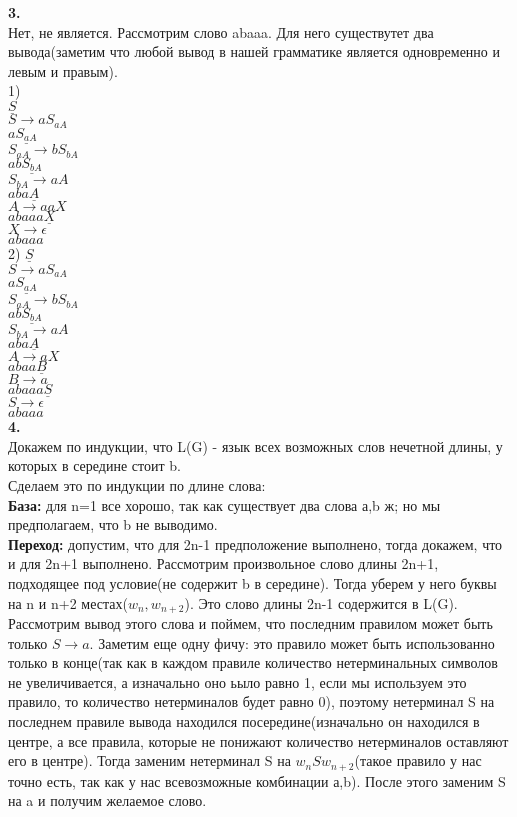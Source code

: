 \documentclass[a4paper,12pt]{article}
\begin{document}
\textbf{3.}\\
Нет, не является. Рассмотрим слово abaaa. Для него существутет два вывода(заметим что любой вывод в нашей грамматике является одновременно и левым и правым).\\
1)\\
$\underline{S}$\\
$S\rightarrow aS_{aA}$\\
$a\underline{S_{aA}}$\\
$S_{aA} \rightarrow bS_{bA}$\\
$ab\underline{S_{bA}}$\\
$S_{bA} \rightarrow aA$\\
$aba\underline{A}$\\
$A \rightarrow aaX$\\
$abaaa\underline{X}$\\
$X \rightarrow \epsilon$\\
$abaaa$\\
2)
$\underline{S}$\\
$S\rightarrow aS_{aA}$\\
$a\underline{S_{aA}}$\\
$S_{aA} \rightarrow bS_{bA}$\\
$ab\underline{S_{bA}}$\\
$S_{bA} \rightarrow aA$\\
$aba\underline{A}$\\
$A \rightarrow aX$\\
$abaa\underline{B}$\\
$B \rightarrow a$\\
$abaaa\underline{S}$\\
$S \rightarrow \epsilon$\\
$abaaa$\\
\textbf{4.}\\
Докажем по индукции, что L(G) - язык всех возможных слов нечетной длины, у которых в середине стоит b.\\
Сделаем это по индукции по длине слова:\\
\textbf{База:} для n=1 все хорошо, так как существует два слова а,b ж; но мы предполагаем, что b не выводимо.\\
\textbf{Переход:} допустим, что для 2n-1 предположение выполнено, тогда докажем, что и для 2n+1 выполнено. Рассмотрим произвольное слово длины 2n+1, подходящее под условие(не содержит b в середине). Тогда уберем у него буквы на n и n+2 местах($w_{n},w_{n+2}$). Это слово длины 2n-1 содержится в L(G). Рассмотрим вывод этого слова и поймем, что последним правилом может быть только $S\rightarrow a$. Заметим еще одну фичу: это правило может быть использованно только в конце(так как в каждом правиле количество нетерминальных символов не увеличивается, а изначально оно ьыло равно 1, если мы используем это правило, то количество нетерминалов будет равно 0), поэтому нетерминал S на последнем правиле вывода находился посередине(изначально он находился в центре, а все правила, которые не понижают количество нетерминалов оставляют его в центре). Тогда заменим нетерминал S на $w_{n}Sw_{n+2}$(такое правило у нас точно есть, так как у нас всевозможные комбинации а,b). После этого заменим S на a и получим желаемое слово.\\
\end{document}
